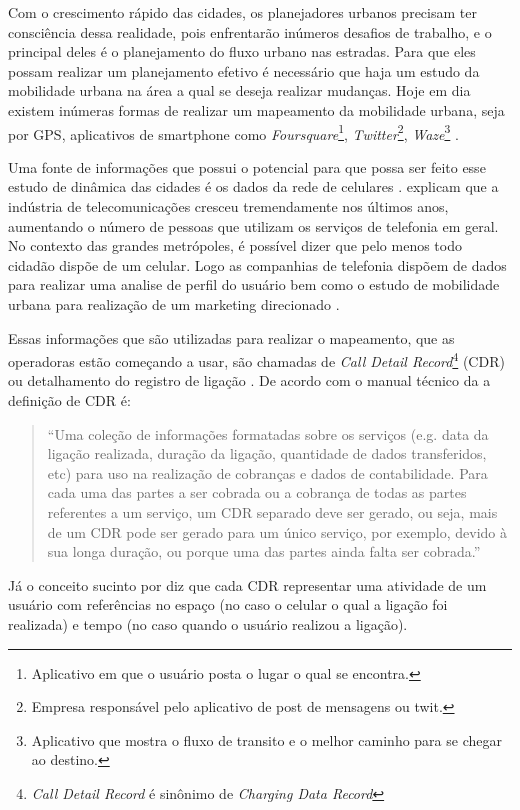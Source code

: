 Com o crescimento rápido das cidades, os planejadores urbanos precisam ter consciência
dessa realidade, pois enfrentarão inúmeros desafios de trabalho, e o principal deles é o
planejamento do fluxo urbano nas estradas. Para que eles possam realizar um planejamento
efetivo é necessário que haja um estudo da mobilidade urbana na área a qual se deseja
realizar mudanças. Hoje em dia existem inúmeras formas de realizar um mapeamento da
mobilidade urbana, seja por GPS, aplicativos de smartphone como \textit{Foursquare}\footnote{
Aplicativo em que o usuário posta o lugar o qual se encontra.}, \textit{Twitter}\footnote{
Empresa responsável pelo aplicativo de post de mensagens ou twit.}, \textit{Waze}\footnote{
Aplicativo que mostra o fluxo de transito e o melhor caminho para se chegar ao destino.}
\cite{tugores2013}.

Uma fonte de informações que possui o potencial para que possa ser feito esse estudo de dinâmica das
cidades é os dados da rede de celulares \cite{becker2011}.  explicam que a
indústria de telecomunicações cresceu tremendamente nos últimos anos, aumentando o
número de pessoas que utilizam os serviços de telefonia em geral. No contexto das grandes
metrópoles, é possível dizer que pelo menos todo cidadão dispõe de um celular. Logo as
companhias de telefonia dispõem de dados para realizar uma analise de perfil do usuário
bem como o estudo de mobilidade urbana para realização de um marketing direcionado
\cite{khan2009}.

Essas informações que são utilizadas para realizar o mapeamento, que as operadoras estão
começando a usar, são chamadas de \textit{Call Detail Record}\footnote{\textit{Call Detail
Record} é sinônimo de \textit{Charging Data Record}} (CDR) ou detalhamento do registro
de ligação \cite{furletti2013}. De acordo com o manual técnico da  a definição de CDR
é: \begin{quote}“Uma coleção de informações formatadas sobre os serviços (e.g. data da
ligação realizada, duração da ligação, quantidade de dados transferidos, etc) para uso na
realização de cobranças e dados de contabilidade. Para cada uma das partes a ser cobrada
ou a cobrança de todas as partes referentes a um serviço, um CDR separado deve ser gerado, ou seja,
mais de um CDR pode ser gerado para um único serviço, por exemplo, devido à sua longa
duração, ou porque uma das partes ainda falta ser cobrada.”\end{quote} Já o conceito sucinto por
 diz que cada CDR representar uma atividade de um usuário com
referências no espaço (no caso o celular o qual a ligação foi realizada) e tempo (no caso
quando o usuário realizou a ligação).

